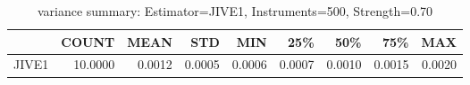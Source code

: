 \begin{table}[ht]
\centering
\caption{variance summary: Estimator=JIVE1, Instruments=500, Strength=0.70}
\begin{tabular}{lrrrrrrrr}
\toprule
 & COUNT & MEAN & STD & MIN & 25\% & 50\% & 75\% & MAX \\
\midrule
JIVE1 & 10.0000 & 0.0012 & 0.0005 & 0.0006 & 0.0007 & 0.0010 & 0.0015 & 0.0020 \\
\bottomrule
\end{tabular}
\end{table}
